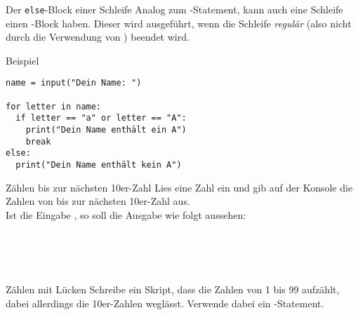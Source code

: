 \begin{fragile}
	

\begin{block}{Der \texttt{else}-Block einer Schleife}
Analog zum -Statement, kann auch eine Schleife einen -Block haben. Dieser wird ausgeführt, wenn die Schleife \emph{regulär} (also nicht durch die Verwendung von ) beendet wird.  
\end{block}


\vspace{12pt} \pause 


\begin{exampleblock}{Beispiel}
\begin{verbatim}
name = input("Dein Name: ")

for letter in name: 
  if letter == "a" or letter == "A":
    print("Dein Name enthält ein A")
    break
else: 
  print("Dein Name enthält kein A")
\end{verbatim}
\end{exampleblock}
	
	
\end{fragile}



\begin{fragile}[Übungen]

\begin{block}{Zählen bis zur nächsten 10er-Zahl}
	\vspace{2pt}
Lies eine Zahl  ein und gib auf der Konsole die Zahlen von  bis zur nächsten 10er-Zahl aus. 
\\
Ist die Eingabe , so soll die Ausgabe wie folgt aussehen: 

\\
\\
\\
\end{block}
	
\vspace{12pt}
\pause 

\begin{block}{Zählen mit Lücken}
	\vspace{2pt}
	Schreibe ein Skript, dass die Zahlen von 1 bis 99 aufzählt, dabei allerdings die 10er-Zahlen weglässt. Verwende dabei ein -Statement.
\end{block}
\end{fragile}


